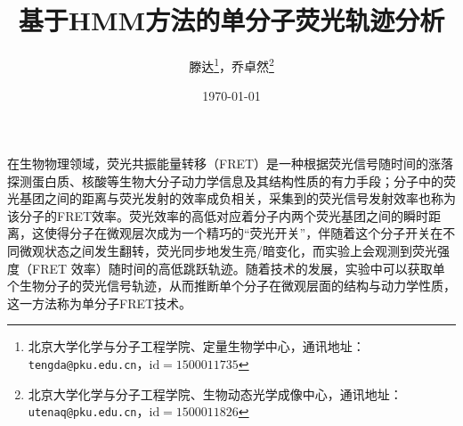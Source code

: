\documentclass[11pt, a4paper]{article}
\begin{document}
\title{基于HMM方法的单分子荧光轨迹分析}
\author{滕达\footnote{北京大学化学与分子工程学院、定量生物学中心，通讯地址：\texttt{tengda@pku.edu.cn}，$\mathrm{id}=1500011735$}，乔卓然\footnote{北京大学化学与分子工程学院、生物动态光学成像中心，通讯地址：\texttt{utenaq@pku.edu.cn}，$\mathrm{id}=1500011826$}}
\date{\today}

\maketitle

在生物物理领域，荧光共振能量转移（FRET）是一种根据荧光信号随时间的涨落探测蛋白质、核酸等生物大分子动力学信息及其结构性质的有力手段；分子中的荧光基团之间的距离与荧光发射的效率成负相关，采集到的荧光信号发射效率也称为该分子的FRET效率。荧光效率的高低对应着分子内两个荧光基团之间的瞬时距离，这使得分子在微观层次成为一个精巧的“荧光开关”，伴随着这个分子开关在不同微观状态之间发生翻转，荧光同步地发生亮/暗变化，而实验上会观测到荧光强度（FRET 效率）随时间的高低跳跃轨迹。随着技术的发展，实验中可以获取单个生物分子的荧光信号轨迹，从而推断单个分子在微观层面的结构与动力学性质，这一方法称为单分子FRET技术。
\end{document}
